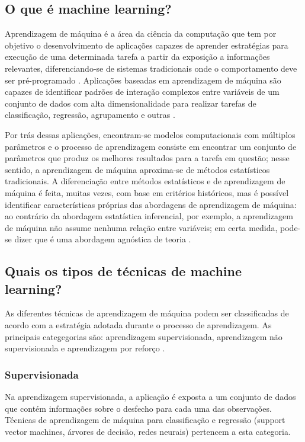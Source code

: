 \subsection{O que é machine learning?}

Aprendizagem de máquina é a área da ciência da computação que tem por objetivo o desenvolvimento
de aplicações capazes de aprender estratégias para execução de uma determinada tarefa a partir da
exposição a informações relevantes, diferenciando-se de sistemas tradicionais onde o comportamento
deve ser pré-programado \cite{Bi2019}. Aplicações baseadas em aprendizagem de máquina são capazes de
identificar padrões de interação complexos entre variáveis de um conjunto de dados com alta dimensionalidade
para realizar tarefas de classificação, regressão, agrupamento e outras \cite{Delgadillo2020}.

Por trás dessas aplicações, encontram-se modelos computacionais com múltiplos parâmetros e o processo de
aprendizagem consiste em encontrar um conjunto de parâmetros que produz os melhores resultados para a tarefa
em questão; nesse sentido, a aprendizagem de máquina aproxima-se de métodos estatísticos tradicionais. A diferenciação
entre métodos estatísticos e de aprendizagem de máquina é feita, muitas vezes, com base em critérios históricos,
mas é possível identificar características próprias das abordagens de aprendizagem de máquina: ao contrário da abordagem
estatística inferencial, por exemplo, a aprendizagem de máquina não assume nenhuma relação entre variáveis; em certa medida,
pode-se dizer que é uma abordagem agnóstica de teoria \cite{Bi2019, Delgadillo2020}.

\subsection{Quais os tipos de técnicas de machine learning?}
As diferentes técnicas de aprendizagem de máquina podem ser classificadas de acordo com a estratégia adotada
durante o processo de aprendizagem. As principais categegorias são: aprendizagem supervisionada, aprendizagem não
supervisionada e aprendizagem por reforço \cite{Bi2019}.

\subsubsection{Supervisionada}
Na aprendizagem supervisionada, a aplicação é exposta a um conjunto de dados que contém informações sobre o desfecho
para cada uma das observações. Técnicas de aprendizagem de máquina para classificação e regressão (support vector machines,
árvores de decisão, redes neurais) pertencem a esta categoria.

